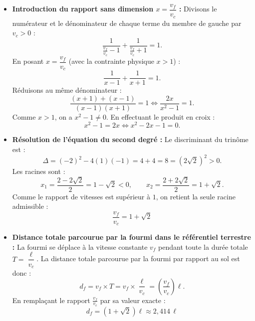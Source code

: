 \documentclass[11pt,a4paper]{article}
\begin{document}
\begin{correctionbox}
\begin{enumerate}
\begin{itemize}[leftmargin=*,label=\textbullet]
        \item \textbf{Introduction du rapport sans dimension $x = \dfrac{v_f}{v_c}$ :}
        Divisons le numérateur et le dénominateur de chaque terme du membre de gauche par $v_c > 0$ :
        \[
        \frac{1}{\frac{v_f}{v_c} - 1} + \frac{1}{\frac{v_f}{v_c} + 1} = 1.
        \]
        En posant $x = \dfrac{v_f}{v_c}$ (avec la contrainte physique $x > 1$) :
        \[
        \frac{1}{x - 1} + \frac{1}{x + 1} = 1.
        \]
        Réduisons au même dénominateur :
        \[
        \frac{(x + 1) + (x - 1)}{(x - 1)(x + 1)} = 1 \iff \frac{2x}{x^2 - 1} = 1.
        \]
        Comme $x > 1$, on a $x^2 - 1 \neq 0$. En effectuant le produit en croix :
        \[
        x^2 - 1 = 2x \iff x^2 - 2x - 1 = 0.
        \]

        \item \textbf{Résolution de l'équation du second degré :}
        Le discriminant du trinôme est :
        \[
        \Delta = (-2)^2 - 4(1)(-1) = 4 + 4 = 8 = (2\sqrt{2})^2 > 0.
        \]
        Les racines sont :
        \[
        x_1 = \frac{2 - 2\sqrt{2}}{2} = 1 - \sqrt{2} < 0, \qquad x_2 = \frac{2 + 2\sqrt{2}}{2} = 1 + \sqrt{2}.
        \]
        Comme le rapport de vitesses est supérieur à $1$, on retient la seule racine admissible :
        \[
        \boxed{\frac{v_f}{v_c} = 1 + \sqrt{2}}
        \]

        \item \textbf{Distance totale parcourue par la fourmi dans le référentiel terrestre :}
        La fourmi se déplace à la vitesse constante $v_f$ pendant toute la durée totale $T = \dfrac{\ell}{v_c}$.
        La distance totale parcourue par la fourmi par rapport au sol est donc :
        \[
        d_f = v_f \times T = v_f \times \frac{\ell}{v_c} = \left(\frac{v_f}{v_c}\right)\ell.
        \]
        En remplaçant le rapport $\frac{v_f}{v_c}$ par sa valeur exacte :
        \[
        \boxed{d_f = (1 + \sqrt{2})\ell \approx 2{,}414\,\ell}
        \]
    \end{itemize}
\end{enumerate}
\end{correctionbox}
\end{document}
